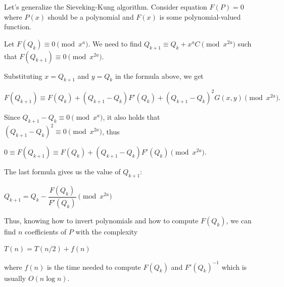     Let's generalize the Sieveking-Kung algorithm. Consider equation $F(P) = 0$ where $P(x)$ should be a polynomial and $F(x)$ is some polynomial-valued function.

    Let $F(Q_k) \equiv 0 \pmod{x^{a}}$. We need to find $Q_{k+1} \equiv Q_k + x^a C \pmod{x^{2a}}$ such that $F(Q_{k+1}) \equiv 0 \pmod{x^{2a}}$.

    Substituting $x = Q_{k+1}$ and $y=Q_k$ in the formula above, we get

    $F(Q_{k+1}) \equiv F(Q_k) + (Q_{k+1} - Q_k) F'(Q_k) + (Q_{k+1} - Q_k)^2 G(x, y) \pmod x^{2a}.$

    Since $Q_{k+1} - Q_k \equiv 0 \pmod{x^a}$, it also holds that $(Q_{k+1} - Q_k)^2 \equiv 0 \pmod{x^{2a}}$, thus

    $0 \equiv F(Q_{k+1}) \equiv F(Q_k) + (Q_{k+1} - Q_k) F'(Q_k) \pmod{x^{2a}}.$

    The last formula gives us the value of $Q_{k+1}$:

    $\boxed{Q_{k+1} = Q_k - \dfrac{F(Q_k)}{F'(Q_k)} \pmod{x^{2a}}}$

    Thus, knowing how to invert polynomials and how to compute $F(Q_k)$, we can find $n$ coefficients of $P$ with the complexity

    $T(n) = T(n/2) + f(n)$

    where $f(n)$ is the time needed to compute $F(Q_k)$ and $F'(Q_k)^{-1}$ which is usually $O(n \log n)$.
